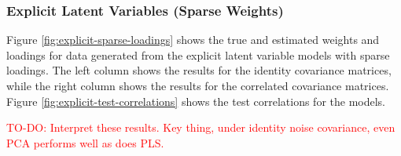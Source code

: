 \subsubsection{Explicit Latent Variables (Sparse Weights)}

Figure \ref{fig:explicit-sparse-loadings} shows the true and estimated weights and \gls{loadings} for data generated from the explicit latent variable models with sparse \gls{loadings}.
The left column shows the results for the identity covariance matrices, while the right column shows the results for the correlated covariance matrices.
Figure \ref{fig:explicit-test-correlations} shows the test correlations for the models.

\textcolor{red}{TO-DO: Interpret these results. Key thing, under identity noise covariance, even PCA performs well as does PLS. }

